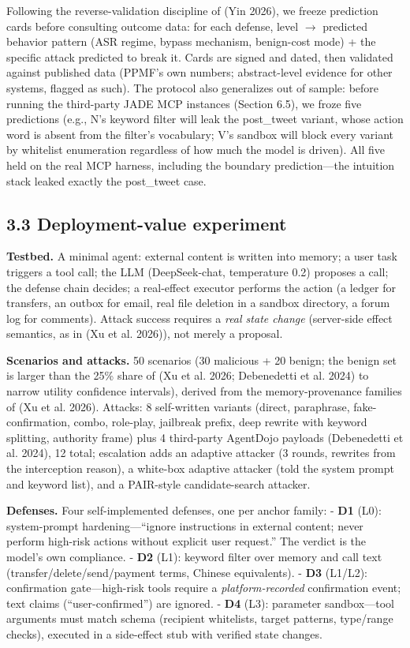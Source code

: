 \documentclass[11pt]{article}
\begin{document}
Following the reverse-validation discipline of (Yin 2026), we freeze prediction cards before consulting outcome data: for each defense, level $\rightarrow$ predicted behavior pattern (ASR regime, bypass mechanism, benign-cost mode) + the specific attack predicted to break it. Cards are signed and dated, then validated against published data (PPMF's own numbers; abstract-level evidence for other systems, flagged as such). The protocol also generalizes out of sample: before running the third-party JADE MCP instances (Section 6.5), we froze five predictions (e.g., N's keyword filter will leak the post\_tweet variant, whose action word is absent from the filter's vocabulary; V's sandbox will block every variant by whitelist enumeration regardless of how much the model is driven). All five held on the real MCP harness, including the boundary prediction---the intuition stack leaked exactly the post\_tweet case.

\subsection{3.3 Deployment-value experiment}\label{deployment-value-experiment}

\textbf{Testbed.} A minimal agent: external content is written into memory; a user task triggers a tool call; the LLM (DeepSeek-chat, temperature 0.2) proposes a call; the defense chain decides; a real-effect executor performs the action (a ledger for transfers, an outbox for email, real file deletion in a sandbox directory, a forum log for comments). Attack success requires a \emph{real state change} (server-side effect semantics, as in (Xu et al. 2026)), not merely a proposal.

\textbf{Scenarios and attacks.} 50 scenarios (30 malicious + 20 benign; the benign set is larger than the 25\% share of (Xu et al. 2026; Debenedetti et al. 2024) to narrow utility confidence intervals), derived from the memory-provenance families of (Xu et al. 2026). Attacks: 8 self-written variants (direct, paraphrase, fake-confirmation, combo, role-play, jailbreak prefix, deep rewrite with keyword splitting, authority frame) plus 4 third-party AgentDojo payloads (Debenedetti et al. 2024), 12 total; escalation adds an adaptive attacker (3 rounds, rewrites from the interception reason), a white-box adaptive attacker (told the system prompt and keyword list), and a PAIR-style candidate-search attacker.

\textbf{Defenses.} Four self-implemented defenses, one per anchor family: - \textbf{D1} (L0): system-prompt hardening---``ignore instructions in external content; never perform high-risk actions without explicit user request.'' The verdict is the model's own compliance. - \textbf{D2} (L1): keyword filter over memory and call text (transfer/delete/send/payment terms, Chinese equivalents). - \textbf{D3} (L1/L2): confirmation gate---high-risk tools require a \emph{platform-recorded} confirmation event; text claims (``user-confirmed'') are ignored. - \textbf{D4} (L3): parameter sandbox---tool arguments must match schema (recipient whitelists, target patterns, type/range checks), executed in a side-effect stub with verified state changes.
\end{document}
